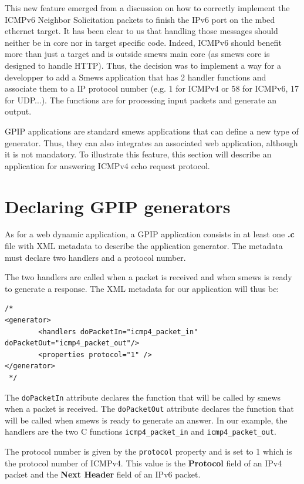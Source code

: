 \documentclass{report}
\begin{document}
This new feature emerged from a discussion on how to correctly implement the
ICMPv6 Neighbor Solicitation packets to finish the IPv6 port on the mbed
ethernet target. It has been clear to us that handling those messages should
neither be in core nor in target specific code. Indeed, ICMPv6 should benefit
more than just a target and is outside smews main core (as smews core is
designed to handle HTTP). Thus, the decision was to implement a way for a
developper to add a Smews application that has 2 handler functions and
associate them to a IP protocol number (e.g. 1 for ICMPv4 or 58 for ICMPv6, 17
for UDP...). The functions are for processing input packets and generate an
output.

GPIP applications are standard smews applications that can define a new type of
generator. Thus, they can also integrates an associated web application,
although it is not mandatory. To illustrate this feature, this section will
describe an application for answering ICMPv4 echo request protocol.

\section{Declaring GPIP generators}
\label{sec:gpipgenerators}

As for a web dynamic application, a GPIP application consists in at least one
\textbf{.c} file with XML metadata to describe the application generator. The
metadata must declare two handlers and a protocol number.

The two handlers are called when a packet is received and when smews is ready
to generate a response. The XML metadata for our application will thus be:

\begin{lstlisting}
/*
<generator>
        <handlers doPacketIn="icmp4_packet_in" doPacketOut="icmp4_packet_out"/>
        <properties protocol="1" />
</generator>
 */
\end{lstlisting}

The \verb!doPacketIn! attribute declares the function that will be called by
smews when a packet is received. The \verb!doPacketOut! attribute declares the
function that will be called when smews is ready to generate an answer. In our
example, the handlers are the two C functions \verb!icmp4_packet_in! and
\verb!icmp4_packet_out!.

The protocol number is given by the \verb!protocol! property and is set to
1 which is the protocol number of ICMPv4. This value is the \textbf{Protocol}
field of an IPv4 packet and the \textbf{Next Header} field of an IPv6 packet.
\end{document}

